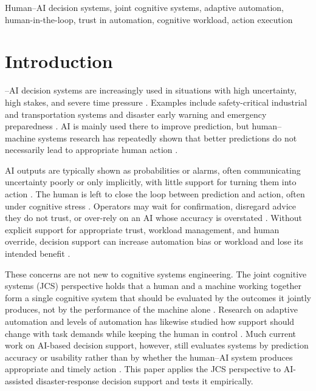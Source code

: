 \documentclass[journal]{IEEEtran}
\theoremstyle{plain}
\theoremstyle{definition}
\begin{document}
    \begin{IEEEkeywords}
        Human--AI decision systems, joint cognitive systems, adaptive automation, human-in-the-loop, trust in automation, cognitive workload, action execution
    \end{IEEEkeywords}

\section{Introduction}
--AI decision systems are increasingly used in situations with high uncertainty, high stakes, and severe time pressure \cite{Bach2024Access,PerezCerrolaza2024CSUR,Yang2022THMSReview}. Examples include safety-critical industrial and transportation systems \cite{Bach2024Access,PerezCerrolaza2024CSUR} and disaster early warning and emergency preparedness \cite{Rokhideh2025IJDRS,Rao2024IJDRS,lim2026generativeaidrivenreliabilitylayer}. AI is mainly used there to improve prediction, but human--machine systems research has repeatedly shown that better predictions do not necessarily lead to appropriate human action \cite{Lai2023FAccT,Muller2022CHIWORK,Hodgson2013THMS}.

AI outputs are typically shown as probabilities or alarms, often communicating uncertainty poorly or only implicitly, with little support for turning them into action \cite{Weidinger2022FAccT,Miller2019XRDS,Bach2024Access}. The human is left to close the loop between prediction and action, often under cognitive stress \cite{Hodgson2013THMS,Zhang2022THMS}. Operators may wait for confirmation, disregard advice they do not trust, or over-rely on an AI whose accuracy is overstated \cite{Hodgson2013THMS,Raji2019AIES,Raji2022CACM,Parasuraman2010}. Without explicit support for appropriate trust, workload management, and human override, decision support can increase automation bias or workload and lose its intended benefit \cite{Zhang2022THMS,Bach2024Access,Lee2004}.

These concerns are not new to cognitive systems engineering. The joint cognitive systems (JCS) perspective holds that a human and a machine working together form a single cognitive system that should be evaluated by the outcomes it jointly produces, not by the performance of the machine alone \cite{Hollnagel2005JCS,Woods2006JCS}. Research on adaptive automation and levels of automation has likewise studied how support should change with task demands while keeping the human in control \cite{Parasuraman2000LOA,Kaber2004,Scerbo2007}. Much current work on AI-based decision support, however, still evaluates systems by prediction accuracy or usability rather than by whether the human--AI system produces appropriate and timely action \cite{Lai2023FAccT,Muller2022CHIWORK,Yang2022THMSReview,lim2026generativeaidrivenreliabilitylayer}. This paper applies the JCS perspective to AI-assisted disaster-response decision support and tests it empirically.
\end{document}
